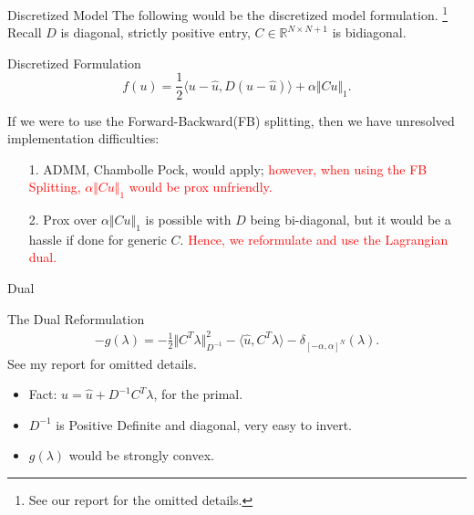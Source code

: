 \documentclass[11pt]{beamer}
\theoremstyle{definition}
\begin{document}
    \begin{frame}{Discretized Model}
        The following would be the discretized model formulation. \footnote{See our report for the omitted details.}
        Recall $D$ is diagonal, strictly positive entry, $C\in \mathbb R^{N\times N+ 1}$ is bidiagonal. 
        \begin{block}{Discretized Formulation}
            \[ 
                f(u) = \frac{1}{2}\langle u - \hat u, D(u - \hat u)\rangle + \alpha \Vert Cu\Vert_1.     
            \]
        \end{block}
        If we were to use the Forward-Backward(FB) splitting, then we have unresolved implementation difficulties: 
        \pause
        \begin{itemize}
            \item [1.] ADMM, Chambolle Pock, would apply; 
                \textcolor{red}{however, when using the FB Splitting, $\alpha\Vert Cu\Vert_1$ would be prox unfriendly. }
            \item [2.] Prox over $\alpha \Vert C u\Vert_1$ is possible with $D$ being bi-diagonal, but it would be a hassle if done for generic $C$. 
            \textcolor{red}{Hence, we reformulate and use the Lagrangian dual. }
        \end{itemize}
    \end{frame}

    \begin{frame}{Dual}
        \begin{block}{The Dual Reformulation}
            \begin{align*}
                - g(\lambda) = -\frac{1}{2}    \Vert C^T\lambda\Vert^2_{D^{-1}} - 
                \langle \hat u, C^T \lambda\rangle - 
                \delta_{[-\alpha, \alpha]^N}(\lambda). 
            \end{align*}
            See my report for omitted details.    
        \end{block}
        \begin{itemize}
            \item Fact: $u = \hat u + D^{-1}C^T\lambda$, for the primal. 
            \item $D^{-1}$ is Positive Definite and diagonal, very easy to invert. 
            \item $g(\lambda)$ would be strongly convex. 
        \end{itemize}
    \end{frame}
\end{document}
